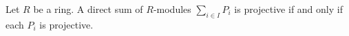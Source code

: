 Let $R$ be a ring. A direct sum of $R$-modules $\sum_{i \in I} P_i$ is projective if and only if each $P_i$ is projective.
